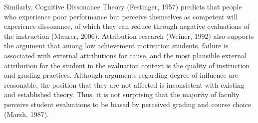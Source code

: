 \documentclass[man]{apa6}
\theoremstyle{definition}
\theoremstyle{definition}
\theoremstyle{definition}
\theoremstyle{remark}
\begin{document}
Similarly, Cognitive Dissonance Theory (Festinger, 1957) predicts that
people who experience poor performance but perceive themselves as
competent will experience dissonance, of which they can reduce through
negative evaluations of the instruction (Maurer, 2006). Attribution
research (Weiner, 1992) also supports the argument that among low
achievement motivation students, failure is associated with external
attributions for cause, and the most plausible external attribution for
the student in the evaluation context is the quality of instruction and
grading practices. Although arguments regarding degree of influence are
reasonable, the position that they are not affected is inconsistent with
existing and established theory. Thus, it is not surprising that the
majority of faculty perceive student evaluations to be biased by
perceived grading and course choice (Marsh, 1987).
\end{document}
